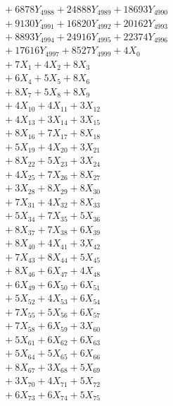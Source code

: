 \documentclass[a4paper,10pt]{article}
\begin{document}
{\begin{align}
&\;  + 6878 Y_{4988} + 24888 Y_{4989} + 18693 Y_{4990} \\[0.3ex]
&\;  + 9130 Y_{4991} + 16820 Y_{4992} + 20162 Y_{4993} \\[0.3ex]
&\;  + 8893 Y_{4994} + 24916 Y_{4995} + 22374 Y_{4996} \\[0.3ex]
&\;  + 17616 Y_{4997} + 8527 Y_{4999} + 4 X_{0} \\[0.3ex]
&\;  + 7 X_{1} + 4 X_{2} + 8 X_{3} \\[0.3ex]
&\;  + 6 X_{4} + 5 X_{5} + 8 X_{6} \\[0.3ex]
&\;  + 8 X_{7} + 5 X_{8} + 8 X_{9} \\[0.5ex]\allowbreak
&\;  + 4 X_{10} + 4 X_{11} + 3 X_{12} \\[0.3ex]
&\;  + 4 X_{13} + 3 X_{14} + 3 X_{15} \\[0.3ex]
&\;  + 8 X_{16} + 7 X_{17} + 8 X_{18} \\[0.3ex]
&\;  + 5 X_{19} + 4 X_{20} + 3 X_{21} \\[0.3ex]
&\;  + 8 X_{22} + 5 X_{23} + 3 X_{24} \\[0.3ex]
&\;  + 4 X_{25} + 7 X_{26} + 8 X_{27} \\[0.3ex]
&\;  + 3 X_{28} + 8 X_{29} + 8 X_{30} \\[0.3ex]
&\;  + 7 X_{31} + 4 X_{32} + 8 X_{33} \\[0.3ex]
&\;  + 5 X_{34} + 7 X_{35} + 5 X_{36} \\[0.3ex]
&\;  + 8 X_{37} + 7 X_{38} + 6 X_{39} \\[0.5ex]\allowbreak
&\;  + 8 X_{40} + 4 X_{41} + 3 X_{42} \\[0.3ex]
&\;  + 7 X_{43} + 8 X_{44} + 5 X_{45} \\[0.3ex]
&\;  + 8 X_{46} + 6 X_{47} + 4 X_{48} \\[0.3ex]
&\;  + 6 X_{49} + 6 X_{50} + 6 X_{51} \\[0.3ex]
&\;  + 5 X_{52} + 4 X_{53} + 6 X_{54} \\[0.3ex]
&\;  + 7 X_{55} + 5 X_{56} + 6 X_{57} \\[0.3ex]
&\;  + 7 X_{58} + 6 X_{59} + 3 X_{60} \\[0.3ex]
&\;  + 5 X_{61} + 6 X_{62} + 6 X_{63} \\[0.3ex]
&\;  + 5 X_{64} + 5 X_{65} + 6 X_{66} \\[0.3ex]
&\;  + 8 X_{67} + 3 X_{68} + 5 X_{69} \\[0.5ex]\allowbreak
&\;  + 3 X_{70} + 4 X_{71} + 5 X_{72} \\[0.3ex]
&\;  + 6 X_{73} + 6 X_{74} + 5 X_{75} \\[0.3ex]

\end{align}}
\end{document}
